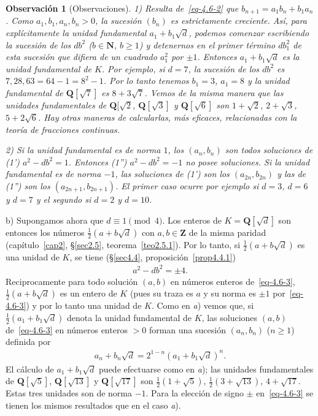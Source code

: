 \documentclass[bibtotoc,leqno,spanish]{amsbook}
\let\emph\relax %
\newcommand{\QQ}{\mathbf{Q}}
\newcommand{\ZZ}{\mathbf{Z}}
\newcommand{\NN}{\mathbf{N}}
\numberwithin{equation}{section}
\theoremstyle{note}
\theoremstyle{note}
\theoremstyle{rem}
\newtheorem*{remark*}{Observaci\'on}
\numberwithin{theorem}{section}
\numberwithin{proposition}{section}
\numberwithin{definition}{section}
\numberwithin{lemma}{section}
\numberwithin{corollary}{section}
\numberwithin{example}{section}
\numberwithin{footnote}{section}%
\begin{document}
\begin{remark*}[Observaciones]
1) Resulta de~\eqref{eq-4.6-2} que $b_{n+1}=a_{1}b_{n}+b_{1}a_{n}$. Como $a_{1}, b_{1}, a_{n}, b_{n}>0$,
la sucesi\'on $(b_{n})$ es estrictamente creciente. As\'i, para \emph{calcular} expl\'icitamente la unidad
fundamental $a_{1}+b_{1}\sqrt{d}$, podemos comenzar escribiendo la sucesi\'on de los $db^{2}$ ($b\in\NN$, $b\geq 1$) y
detenernos en el primer t\'ermino $db_{1}^{2}$ de esta sucesi\'on que difiera de un cuadrado $a_{1}^{2}$
por $\pm 1$. Entonces $a_{1}+b_{1}\sqrt{d}$ es la unidad fundamental de $K$. Por ejemplo, si $d=7$, la
sucesi\'on de los $db^{2}$ es $7, 28, 63=64-1=8^{2}-1$. Por lo tanto tenemos $b_{1}=3$, $a_{1}=8$ y
la unidad fundamental de $\QQ[\sqrt{7}]$ es $8+3\sqrt{7}$. Vemos de la misma manera que las unidades
fundamentales de $\QQ[\sqrt{2}$, $\QQ[\sqrt{3}]$ y $\QQ[\sqrt{6}]$ son $1+\sqrt{2}$, $2+\sqrt{3}$, $5+2\sqrt{6}$.
Hay otras maneras de calcularlas, m\'as eficaces, relacionadas con la teor\'ia de fracciones continuas.

2) Si la unidad fundamental es de norma $1$, los $(a_{n},b_{n})$ son todos soluciones de
(1') $a^{2}-db^{2}=1$. Entonces (1'') $a^{2}-db^{2}=-1$ no posee soluciones. Si la unidad fundamental es de norma
$-1$, las soluciones de (1') son los $(a_{2n},b_{2n})$ y las de (1'') son los $(a_{2n+1},b_{2n+1})$. El primer
caso ocurre por ejemplo si $d=3$, $d=6$ y $d=7$ y el segundo si $d=2$ y $d=10$.
\end{remark*}

b) Supongamos ahora que $d\equiv 1\pmod 4$. Los enteros de $K=\QQ[\sqrt{d}]$ son entonces los n\'umeros
$\frac{1}{2}(a+b\sqrt{d})$ con $a,b\in\ZZ$ de la misma paridad (cap\'itulo~\ref{cap2}, \S\ref{sec2.5}, teorema~\ref{teo2.5.1}).
Por lo tanto, si $\frac{1}{2}(a+b\sqrt{d})$ es una unidad de $K$, se tiene (\S\ref{sec4.4}, proposici\'on~\ref{prop4.4.1})
\begin{gather}\label{eq-4.6-3}
a^{2}-db^{2}=\pm 4.
\end{gather}
Reciprocamente para todo soluci\'on $(a,b)$ en n\'umeros enteros de~\eqref{eq-4.6-3}, $\frac{1}{2}(a+b\sqrt{d})$
es un entero de $K$ (pues su traza es $a$ y su norma es $\pm 1$ por~\eqref{eq-4.6-3}) y por lo tanto una unidad de $K$.
Como en {\itshape a}) vemos que, si $\frac{1}{2}(a_{1}+b_{1}\sqrt{d})$ denota la unidad fundamental de $K$, las
soluciones $(a,b)$ de~\eqref{eq-4.6-3} en n\'umeros enteros $>0$ forman una sucesi\'on $(a_{n},b_{n})$ ($n\geq 1$)
definida por
\begin{gather}
a_{n}+b_{n}\sqrt{d}=2^{1-n}(a_{1}+b_{1}\sqrt{d})^{n}.
\end{gather}
El c\'alculo de $a_{1}+b_{1}\sqrt{d}$ puede efectuarse como en {\itshape a}); las unidades fundamentales
de $\QQ[\sqrt{5}]$, $\QQ[\sqrt{13}]$ y $\QQ[\sqrt{17}]$ son $\frac{1}{2}(1+\sqrt{5})$, $\frac{1}{2}(3+\sqrt{13})$,
$4+\sqrt{17}$. Estas tres unidades son de norma $-1$. Para la elecci\'on de signo $\pm$ en~\eqref{eq-4.6-3} se tienen
los mismos resultados que en el caso {\itshape a}).
\end{document}
